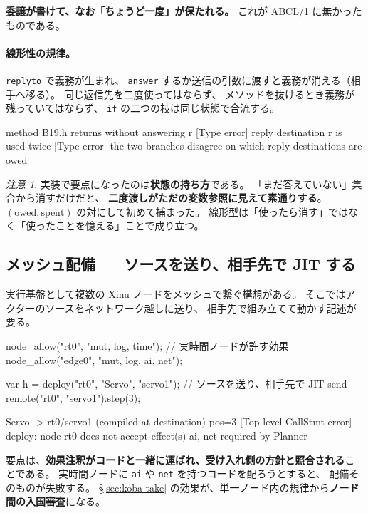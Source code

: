 \documentclass[11pt,a4paper]{ltjsarticle}
\theoremstyle{definition}
\theoremstyle{remark}
\newtheorem{remark}[theorem]{注意}
\begin{document}
\textbf{委譲が書けて、なお「ちょうど一度」が保たれる。}
これが ABCL/1 に無かったものである。

\paragraph{線形性の規律。}
\texttt{replyto} で義務が生まれ、
\texttt{answer} するか送信の引数に渡すと義務が消える（相手へ移る）。
同じ返信先を二度使ってはならず、
メソッドを抜けるとき義務が残っていてはならず、
\texttt{if} の二つの枝は同じ状態で合流する。

\begin{term}
 method B19.h returns without answering r
[Type error] reply destination r is used twice
[Type error] the two branches disagree on which reply destinations are owed
\end{term}

\begin{remark}
実装で要点になったのは\textbf{状態の持ち方}である。
「まだ答えていない」集合から消すだけだと、
\textbf{二度渡しがただの変数参照に見えて素通りする}。
$(\text{owed}, \text{spent})$ の対にして初めて捕まった。
線形型は「使ったら消す」ではなく「使ったことを憶える」ことで成り立つ。
\end{remark}

\subsection{メッシュ配備 --- ソースを送り、相手先で JIT する}
\label{sec:mesh}

実行基盤として複数の Xinu ノードをメッシュで繋ぐ構想がある。
そこではアクターのソースをネットワーク越しに送り、
相手先で組み立てて動かす記述が要る。

\begin{aipl}
node_allow("rt0",   "mut, log, time");        // 実時間ノードが許す効果
node_allow("edge0", "mut, log, ai, net");

var h = deploy("rt0", "Servo", "servo1");     // ソースを送り、相手先で JIT
send remote("rt0", "servo1").step(3);
\end{aipl}
\begin{term}
[deploy] Servo -> rt0/servo1 (compiled at destination)
pos=3
[Top-level CallStmt error] deploy: node rt0 does not accept effect(s) {ai, net}
                           required by Planner
\end{term}

要点は、\textbf{効果注釈がコードと一緒に運ばれ、受け入れ側の方針と照合される}ことである。
実時間ノードに \texttt{ai} や \texttt{net} を持つコードを配ろうとすると、
配備そのものが失敗する。
\S\ref{sec:koba-take} の効果が、単一ノード内の規律から\textbf{ノード間の入国審査}になる。
\end{document}
